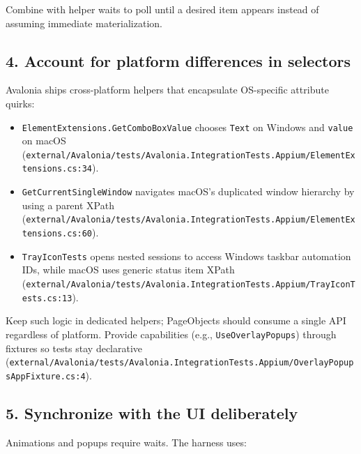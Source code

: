 Combine with helper waits to poll until a desired item appears instead
of assuming immediate materialization.

\subsection{4. Account for platform differences in
selectors}\label{account-for-platform-differences-in-selectors}

Avalonia ships cross-platform helpers that encapsulate OS-specific
attribute quirks:

\begin{itemize}
\tightlist
\item
  \passthrough{\lstinline!ElementExtensions.GetComboBoxValue!} chooses
  \passthrough{\lstinline!Text!} on Windows and
  \passthrough{\lstinline!value!} on macOS
  (\passthrough{\lstinline!external/Avalonia/tests/Avalonia.IntegrationTests.Appium/ElementExtensions.cs:34!}).
\item
  \passthrough{\lstinline!GetCurrentSingleWindow!} navigates macOS's
  duplicated window hierarchy by using a parent XPath
  (\passthrough{\lstinline!external/Avalonia/tests/Avalonia.IntegrationTests.Appium/ElementExtensions.cs:60!}).
\item
  \passthrough{\lstinline!TrayIconTests!} opens nested sessions to
  access Windows taskbar automation IDs, while macOS uses generic status
  item XPath
  (\passthrough{\lstinline!external/Avalonia/tests/Avalonia.IntegrationTests.Appium/TrayIconTests.cs:13!}).
\end{itemize}

Keep such logic in dedicated helpers; PageObjects should consume a
single API regardless of platform. Provide capabilities (e.g.,
\passthrough{\lstinline!UseOverlayPopups!}) through fixtures so tests
stay declarative
(\passthrough{\lstinline!external/Avalonia/tests/Avalonia.IntegrationTests.Appium/OverlayPopupsAppFixture.cs:4!}).

\subsection{5. Synchronize with the UI
deliberately}\label{synchronize-with-the-ui-deliberately}

Animations and popups require waits. The harness uses:

